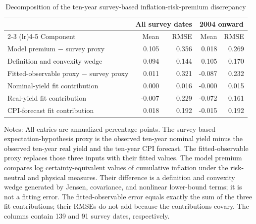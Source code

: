 \begin{table}[!htbp]
\centering
\caption{Decomposition of the ten-year survey-based inflation-risk-premium discrepancy}
\label{tab:irp_decomposition}
\begin{threeparttable}
\small
\begin{tabular*}{\textwidth}{@{\extracolsep{\fill}}lrrrr}
\toprule
 & \multicolumn{2}{c}{All survey dates} & \multicolumn{2}{c}{2004 onward} \\
\cmidrule(lr){2-3} \cmidrule(lr){4-5}
Component & Mean & RMSE & Mean & RMSE \\ \midrule
Model premium $-$ survey proxy & 0.105 & 0.356 & 0.018 & 0.269 \\
\quad Definition and convexity wedge & 0.094 & 0.144 & 0.105 & 0.170 \\
\quad Fitted-observable proxy $-$ survey proxy & 0.011 & 0.321 & -0.087 & 0.232 \\
\qquad Nominal-yield fit contribution & 0.000 & 0.016 & -0.000 & 0.015 \\
\qquad Real-yield fit contribution & -0.007 & 0.229 & -0.072 & 0.161 \\
\qquad CPI-forecast fit contribution & 0.018 & 0.192 & -0.015 & 0.192 \\
\bottomrule
\end{tabular*}
\begin{tablenotes}[flushleft]
\footnotesize
\item Notes: All entries are annualized percentage points. The survey-based expectation-hypothesis proxy is the observed ten-year nominal yield minus the observed ten-year real yield and the ten-year CPI forecast. The fitted-observable proxy replaces those three inputs with their fitted values. The model premium compares log certainty-equivalent values of cumulative inflation under the risk-neutral and physical measures. Their difference is a definition and convexity wedge generated by Jensen, covariance, and nonlinear lower-bound terms; it is not a fitting error. The fitted-observable error equals exactly the sum of the three fit contributions; their RMSEs do not add because the contributions covary. The columns contain 139 and 91 survey dates, respectively.
\end{tablenotes}
\end{threeparttable}
\end{table}
